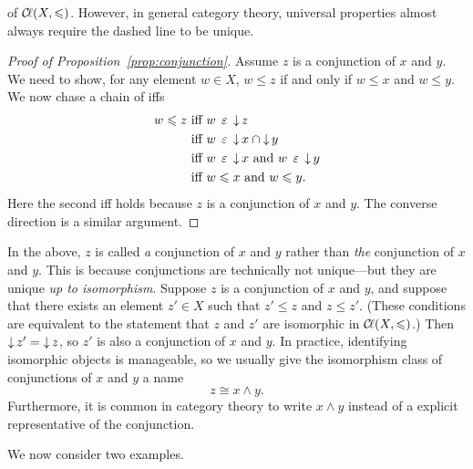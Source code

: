 \documentclass[../main.tex]{subfiles}
\begin{document}
of \({\mathcal{C}\kern-.15em\ell}{\left(X,\leqslant\right)}\). However, in general category theory, universal
properties almost always require the dashed line to be unique.
\begin{proof}[Proof of Proposition~\ref{prop:conjunction}]
  Assume \(z\) is a conjunction of \(x\) and \(y\). We need to show, for any
  element \(w \in X\), \(w \leq z\) if and only if \(w \leq x\) and \(w \leq
  y\). We now chase a chain of iffs
  \begin{align*}
    w \leqslant z &\text{ iff } w \mathrel{\,\varepsilon\,} \operatorname{\downarrow} z\\
    &\text{ iff } w \mathrel{\,\varepsilon\,} \operatorname{\downarrow} x \cap \operatorname{\downarrow} y\\
    &\text{ iff } w \mathrel{\,\varepsilon\,} \operatorname{\downarrow} x \text{ and } w \mathrel{\,\varepsilon\,} \operatorname{\downarrow} y\\
    &\text{ iff } w \leqslant x \text{ and } w \leqslant y.
  \end{align*}
  Here the second iff holds because \(z\) is a conjunction of \(x\) and
  \(y\). The converse direction is a similar argument.
\end{proof}
\begin{remark}
  In the above, \(z\) is called \emph{a} conjunction of \(x\) and \(y\) rather
  than \emph{the} conjunction of \(x\) and \(y\). This is because conjunctions
  are technically not unique---but they are unique \emph{up to
    isomorphism}. Suppose \(z\) is a conjunction of \(x\) and \(y\), and suppose
  that there exists an element \(z' \in X\) such that \(z' \leq z\) and
  \(z \leq z'\). (These conditions are equivalent to the statement that \(z\)
  and \(z'\) are isomorphic in \({\mathcal{C}\kern-.15em\ell}{\left(X,\leqslant\right)}\).) Then \(\operatorname{\downarrow} z' = \operatorname{\downarrow}
  z\), so \(z'\) is also a conjunction of \(x\) and \(y\). In practice,
  identifying isomorphic objects is manageable, so we usually give the
  isomorphism class of conjunctions of \(x\) and \(y\) a name
  \[%
    z \cong x \wedge y.
  \]%
  Furthermore, it is common in category theory to write \(x \wedge y\) instead
  of a explicit representative of the conjunction.
\end{remark}
We now consider two examples.
\end{document}
